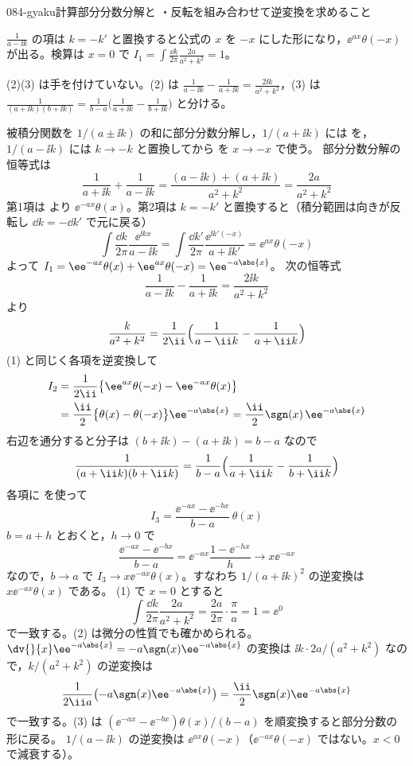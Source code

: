 \documentclass[uplatex,dvipdfmx,a4paper,11pt]{jsarticle}
\begin{document}
\begin{mondai}{084-gyaku}{計算}{部分分数分解と ・反転を組み合わせて逆変換を求めること}
\begin{kizuki}
\item $\frac{1}{a-\ii k}$ の項は $k=-k'$ と置換すると公式の $x$ を $-x$ にした形になり，$\ee^{ax}\theta(-x)$ が出る。検算は $x=0$ で $I_1=\int\frac{\dd k}{2\pi}\frac{2a}{a^{2}+k^{2}}=1$。
\item (2)(3) は手を付けていない。(2) は $\frac{1}{a-\ii k}-\frac{1}{a+\ii k}=\frac{2\ii k}{a^{2}+k^{2}}$，(3) は $\frac{1}{(a+\ii k)(b+\ii k)}=\frac{1}{b-a}\bigl(\frac{1}{a+\ii k}-\frac{1}{b+\ii k}\bigr)$ と分ける。
\end{kizuki}
\begin{tadashii}
\houshin 被積分関数を $1/(a\pm\ii k)$ の和に部分分数分解し，$1/(a+\ii k)$ には  を，$1/(a-\ii k)$ には $k\to-k$ と置換してから  を $x\to-x$ で使う。
\keisan
{} 部分分数分解の恒等式は
\[ \frac{1}{a+\ii k}+\frac{1}{a-\ii k}=\frac{(a-\ii k)+(a+\ii k)}{a^{2}+k^{2}}=\frac{2a}{a^{2}+k^{2}} \]
第1項は  より $\ee^{-ax}\theta(x)$。第2項は $k=-k'$ と置換すると（積分範囲は向きが反転し $\dd k=-\dd k'$ で元に戻る）
\[ \int\frac{\dd k}{2\pi}\frac{\ee^{\ii kx}}{a-\ii k}=\int\frac{\dd k'}{2\pi}\frac{\ee^{\ii k'(-x)}}{a+\ii k'}=\ee^{ax}\theta(-x) \]
よって $I_1=\ee^{-ax}\theta(x)+\ee^{ax}\theta(-x)=\ee^{-a\abs{x}}$。
 次の恒等式
\[ \frac{1}{a-\ii k}-\frac{1}{a+\ii k}=\frac{2\ii k}{a^{2}+k^{2}} \]
より
\[ \frac{k}{a^{2}+k^{2}}=\frac{1}{2\ii}\Bigl(\frac{1}{a-\ii k}-\frac{1}{a+\ii k}\Bigr) \]
(1) と同じく各項を逆変換して
\begin{align*}
  I_2&=\frac{1}{2\ii}\bigl\{\ee^{ax}\theta(-x)-\ee^{-ax}\theta(x)\bigr\}\\
  &=\frac{\ii}{2}\bigl\{\theta(x)-\theta(-x)\bigr\}\ee^{-a\abs{x}}=\frac{\ii}{2}\sgn(x)\,\ee^{-a\abs{x}}
\end{align*}
 右辺を通分すると分子は $(b+\ii k)-(a+\ii k)=b-a$ なので
\[ \frac{1}{(a+\ii k)(b+\ii k)}=\frac{1}{b-a}\Bigl(\frac{1}{a+\ii k}-\frac{1}{b+\ii k}\Bigr) \]
各項に  を使って
\[ I_3=\frac{\ee^{-ax}-\ee^{-bx}}{b-a}\,\theta(x) \]
$b=a+h$ とおくと，$h\to0$ で
\[ \frac{\ee^{-ax}-\ee^{-bx}}{b-a}=\ee^{-ax}\frac{1-\ee^{-hx}}{h}\to x\ee^{-ax} \]
なので，$b\to a$ で $I_3\to x\ee^{-ax}\theta(x)$。すなわち $1/(a+\ii k)^{2}$ の逆変換は $x\ee^{-ax}\theta(x)$ である。
\kenzan (1) で $x=0$ とすると
\[ \int\frac{\dd k}{2\pi}\frac{2a}{a^{2}+k^{2}}=\frac{2a}{2\pi}\cdot\frac{\pi}{a}=1=\ee^{0} \]
で一致する。(2) は微分の性質でも確かめられる。$\dv{}{x}\ee^{-a\abs{x}}=-a\sgn(x)\ee^{-a\abs{x}}$ の変換は $\ii k\cdot2a/(a^{2}+k^{2})$ なので，$k/(a^{2}+k^{2})$ の逆変換は
\[ \frac{1}{2\ii a}\bigl(-a\sgn(x)\ee^{-a\abs{x}}\bigr)=\frac{\ii}{2}\sgn(x)\ee^{-a\abs{x}} \]
で一致する。(3) は $(\ee^{-ax}-\ee^{-bx})\theta(x)/(b-a)$ を順変換すると部分分数の形に戻る。
\tsumazuki $1/(a-\ii k)$ の逆変換は $\ee^{ax}\theta(-x)$（$\ee^{-ax}\theta(-x)$ ではない。$x<0$ で減衰する）。
\end{tadashii}
\end{mondai}

\noteowari
\end{document}
